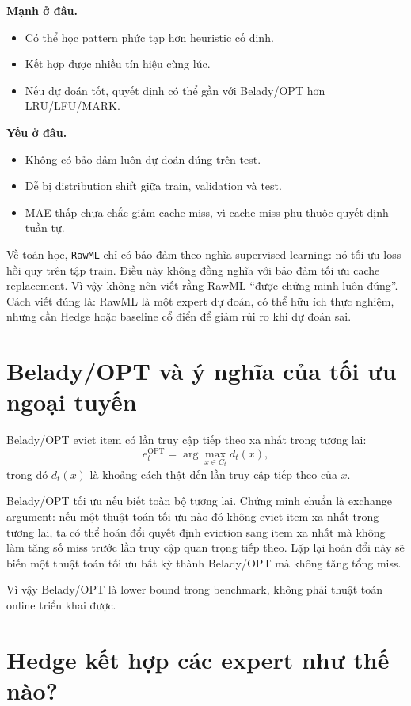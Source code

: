 \documentclass[11pt,a4paper]{article}
\newcommand{\code}[1]{\texttt{#1}}
\newcommand{\rawml}{\code{RawML}}
\begin{document}
\textbf{Mạnh ở đâu.}
\begin{itemize}[leftmargin=1.4em]
    \item Có thể học pattern phức tạp hơn heuristic cố định.
    \item Kết hợp được nhiều tín hiệu cùng lúc.
    \item Nếu dự đoán tốt, quyết định có thể gần với Belady/OPT hơn LRU/LFU/MARK.
\end{itemize}

\textbf{Yếu ở đâu.}
\begin{itemize}[leftmargin=1.4em]
    \item Không có bảo đảm luôn dự đoán đúng trên test.
    \item Dễ bị distribution shift giữa train, validation và test.
    \item MAE thấp chưa chắc giảm cache miss, vì cache miss phụ thuộc quyết định tuần tự.
\end{itemize}

Về toán học, \rawml{} chỉ có bảo đảm theo nghĩa supervised learning: nó tối ưu loss hồi quy trên tập train. Điều này không đồng nghĩa với bảo đảm tối ưu cache replacement. Vì vậy không nên viết rằng RawML ``được chứng minh luôn đúng''. Cách viết đúng là: RawML là một expert dự đoán, có thể hữu ích thực nghiệm, nhưng cần Hedge hoặc baseline cổ điển để giảm rủi ro khi dự đoán sai.

\section{Belady/OPT và ý nghĩa của tối ưu ngoại tuyến}

Belady/OPT evict item có lần truy cập tiếp theo xa nhất trong tương lai:
\[
    e_t^{\mathrm{OPT}}
    =
    \arg\max_{x\in C_t} d_t(x),
\]
trong đó \(d_t(x)\) là khoảng cách thật đến lần truy cập tiếp theo của \(x\).

Belady/OPT tối ưu nếu biết toàn bộ tương lai. Chứng minh chuẩn là exchange argument: nếu một thuật toán tối ưu nào đó không evict item xa nhất trong tương lai, ta có thể hoán đổi quyết định eviction sang item xa nhất mà không làm tăng số miss trước lần truy cập quan trọng tiếp theo. Lặp lại hoán đổi này sẽ biến một thuật toán tối ưu bất kỳ thành Belady/OPT mà không tăng tổng miss.

Vì vậy Belady/OPT là lower bound trong benchmark, không phải thuật toán online triển khai được.

\section{Hedge kết hợp các expert như thế nào?}
\end{document}
